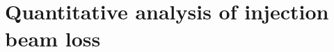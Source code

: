 \chapter{Quantitative analysis of injection beam loss}\label{sec:Quantitative analysis of injection beam loss}